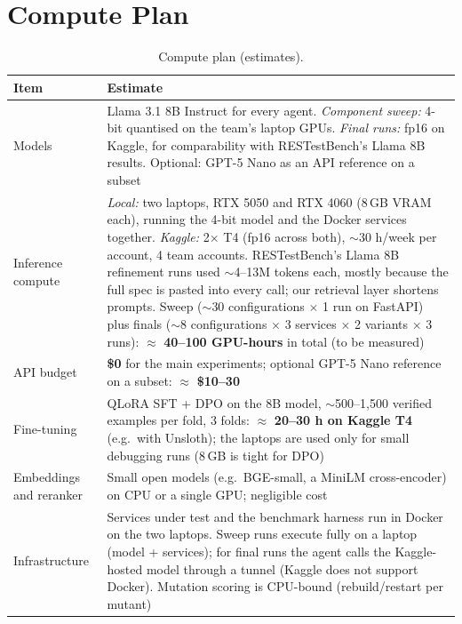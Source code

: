\documentclass[11pt,a4paper]{article}
\begin{document}
\section{Compute Plan}
\begin{table}[H]
\centering\small
\begin{tabularx}{\linewidth}{@{}P{3.4cm}L@{}}
\toprule
\textbf{Item} & \textbf{Estimate}\\
\midrule
Models & Llama 3.1 8B Instruct for every agent. \emph{Component sweep:} 4-bit quantised on the team's laptop GPUs. \emph{Final runs:} fp16 on Kaggle, for comparability with RESTestBench's Llama 8B results. Optional: GPT-5 Nano as an API reference on a subset\\
Inference compute & \emph{Local:} two laptops, RTX 5050 and RTX 4060 (8\,GB VRAM each), running the 4-bit model and the Docker services together. \emph{Kaggle:} 2$\times$ T4 (fp16 across both), $\sim$30 h/week per account, 4 team accounts. RESTestBench's Llama 8B refinement runs used $\sim$4--13M tokens each, mostly because the full spec is pasted into every call; our retrieval layer shortens prompts. Sweep ($\sim$30 configurations $\times$ 1 run on FastAPI) plus finals ($\sim$8 configurations $\times$ 3 services $\times$ 2 variants $\times$ 3 runs): $\approx$ \textbf{40--100 GPU-hours} in total (to be measured)\\
API budget & \textbf{\$0} for the main experiments; optional GPT-5 Nano reference on a subset: $\approx$ \textbf{\$10--30}\\
Fine-tuning & QLoRA SFT + DPO on the 8B model, $\sim$500--1{,}500 verified examples per fold, 3 folds: $\approx$ \textbf{20--30 h on Kaggle T4} (e.g.\ with Unsloth); the laptops are used only for small debugging runs (8\,GB is tight for DPO)\\
Embeddings and reranker & Small open models (e.g.\ BGE-small, a MiniLM cross-encoder) on CPU or a single GPU; negligible cost\\
Infrastructure & Services under test and the benchmark harness run in Docker on the two laptops. Sweep runs execute fully on a laptop (model + services); for final runs the agent calls the Kaggle-hosted model through a tunnel (Kaggle does not support Docker). Mutation scoring is CPU-bound (rebuild/restart per mutant)\\
\bottomrule
\end{tabularx}
\caption{Compute plan (estimates).}
\end{table}

\end{document}
